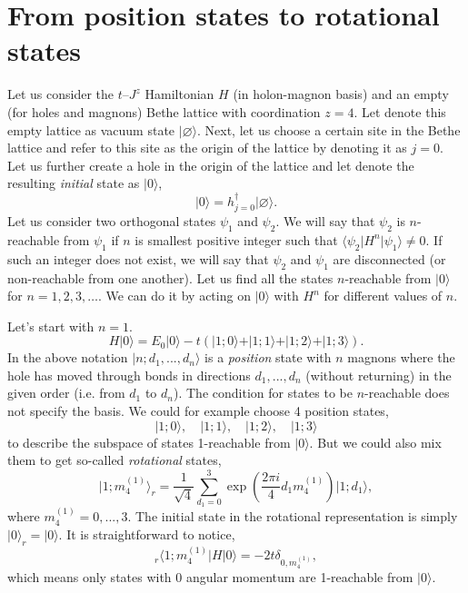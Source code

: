 \documentclass[11pt, a4paper, onecolumn]{article}
\newcommand{\ket}[1]{\vert #1 \rangle}
\newcommand{\bra}[1]{\langle #1 \vert}
\begin{document}
\section{From position states to rotational states}

Let us consider the $t$--$J^z$ Hamiltonian $H$ (in holon-magnon basis) and an empty (for holes and magnons) Bethe lattice with coordination $z=4$. Let denote this empty lattice as vacuum state $\ket{\varnothing}$. Next, let us choose a certain site in the Bethe lattice and refer to this site as the origin of the lattice by denoting it as $j=0$. Let us further create a hole in the origin of the lattice and let denote the resulting \textit{initial} state as $\ket{0}$,
\begin{equation}
	\ket{0} = h_{j=0}^\dag \ket{\varnothing}.
\end{equation} 
Let us consider two orthogonal states $\psi_1$ and $\psi_2$. We will say that $\psi_2$ is $n$-reachable from $\psi_1$ if $n$ is smallest positive integer such that $\bra{\psi_2}H^n\ket{\psi_1} \neq 0$. If such an integer does not exist, we will say that $\psi_2$ and $\psi_1$ are disconnected (or non-reachable from one another). Let us find all the states $n$-reachable from $\ket{0}$ for $n=1,2,3,\hdots$. We can do it by acting on $\ket{0}$ with $H^n$ for different values of $n$. 

Let's start with $n=1$.
\begin{equation}
	H\ket{0} = E_0 \ket{0} - t(\ket{1;0}+\ket{1;1}+\ket{1;2}+\ket{1;3}).
\end{equation}
In the above notation $\ket{n;d_1,...,d_n}$ is a \textit{position} state with $n$ magnons where the hole has moved through bonds in directions $d_1,...,d_n$ (without returning) in the given order (i.e. from $d_1$ to $d_n$). The condition for states to be $n$-reachable does not specify the basis. We could for example choose 4 position states,
\begin{equation}
	\ket{1;0}, \quad \ket{1;1}, \quad \ket{1;2}, \quad \ket{1;3}
\end{equation}
to describe the subspace of states 1-reachable from $\ket{0}$. But we could also mix them to get so-called \textit{rotational} states,
\begin{equation}
	\ket{1;m^{(1)}_4}_r = \frac{1}{\sqrt{4}}\sum_{d_1=0}^3 \exp\left(\frac{2 \pi i}{4}d_1 m^{(1)}_4\right)\ket{1;d_1},
\end{equation}
where $m^{(1)}_4 = 0,...,3$. The initial state in the rotational representation is simply $\ket{0}_r = \ket{0}$. It is straightforward to notice,
\begin{equation}
	_r\bra{1;m^{(1)}_4} H\ket{0} = -2t \delta_{0,m^{(1)}_4},
\end{equation}
which means only states with $0$ angular momentum are 1-reachable from $\ket{0}$. 
\end{document}
